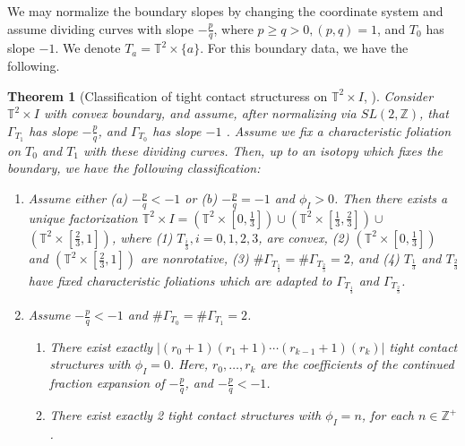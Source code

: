 \documentclass{amsart}
\theoremstyle{plain}
\newtheorem{thm}{Theorem}
\theoremstyle{remark}
\theoremstyle{definition}
\begin{document}
We may normalize the boundary slopes by changing the coordinate system and assume dividing curves with slope $-\frac{p}{q}$, where $p \geq q>0,(p, q)=1$, and $T_0$ has slope $-1$. We denote $T_a = \mathbb{T}^2\times \{a\} $. For this boundary data, we have the following.

\begin{thm}[Classification of tight contact structuress on $\mathbb{T}^2 \times I$, \cite{KH}]\label{thm: ClassOfTgtCSonT2xI}
Consider $\mathbb{T}^2 \times I$ with convex boundary, and assume, after normalizing via $S L(2, \mathbb{Z})$, that $\Gamma_{T_1}$ has slope $-\frac{p}{q}$, and $\Gamma_{T_0}$ has slope $-1$ . Assume we fix a characteristic foliation on $T_0$ and $T_1$ with these dividing curves. Then, up to an isotopy which fixes the boundary, we have the following classification:
\begin{enumerate}
    \item Assume either (a) $-\frac{p}{q}<-1$ or (b) $-\frac{p}{q}=-1$ and $\phi_I>0$. Then there exists a unique factorization $\mathbb{T}^2 \times I=\left(\mathbb{T}^2 \times\left[0, \frac{1}{3}\right]\right) \cup\left(\mathbb{T}^2 \times\left[\frac{1}{3}, \frac{2}{3}\right]\right) \cup$ $(\mathbb{T}^2 \times\left[\frac{2}{3}, 1\right])$, where (1) $T_{\frac{i}{3}}, i=0,1,2,3$, are convex, (2) $\left(\mathbb{T}^2 \times\left[0, \frac{1}{3}\right]\right)$ and $(\mathbb{T}^2 \times\left[\frac{2}{3}, 1\right])$ are nonrotative, (3) $\# \Gamma_{T_{\frac{1}{3}}}=\# \Gamma_{T_{\frac{2}{3}}}=2$, and (4) $T_{\frac{1}{3}}$ and $T_{\frac{2}{3}}$ have fixed characteristic foliations which are adapted to $\Gamma_{T_{\frac{1}{3}}}$ and $\Gamma_{T_{\frac{2}{3}}}$.
    \item  Assume $-\frac{p}{q}<-1$ and $\# \Gamma_{T_0}=\# \Gamma_{T_1}=2$.
    \begin{enumerate}
    \item  There exist exactly $\left|\left(r_0+1\right)\left(r_1+1\right) \cdots\left(r_{k-1}+1\right)\left(r_k\right)\right|$ tight contact structures with $\phi_I=0$. Here, $r_0, \ldots, r_k$ are the coefficients of the continued fraction expansion of $-\frac{p}{q}$, and $-\frac{p}{q}<-1$.
        \item There exist exactly 2 tight contact structures with $\phi_I=n$, for each $n \in \mathbb{Z}^{+}$.
    \end{enumerate}


\end{enumerate}
\end{thm}
\end{document}
